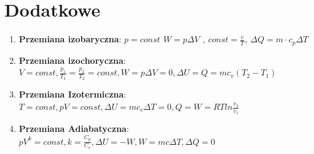\documentclass[12pt,twoside,a4paper]{book}
\begin{document}
\chapter{Dodatkowe}
\begin{enumerate}[label=(\alph*)]
\item\textbf{Przemiana izobaryczna}: \textit{$p=const$ $W=p \Delta V$ , $const=\frac{v}{T}$, $\Delta Q = m \cdot c_p \Delta T$}
\item\textbf{Przemiana izochoryczna}: \textit{$V=const, \frac{p_1}{T_1}=\frac{p_2}{T_2}=const, W=p\Delta V=0, \Delta U=Q=mc_v(T_2-T_1)$}
\item\textbf{Przemiana Izotermiczna}: \textit{$T=const, pV=const, \Delta U =mc_v\Delta T=0, Q=W=RTln\frac{v_2}{v_1} $}
\item\textbf{Przemiana Adiabatyczna}: \textit{$pV^k=const, k=\frac{C_p}{C_v}, \Delta U=-W, W=mc\Delta T, \Delta Q=0 $}
\end{enumerate}
\end{document}

